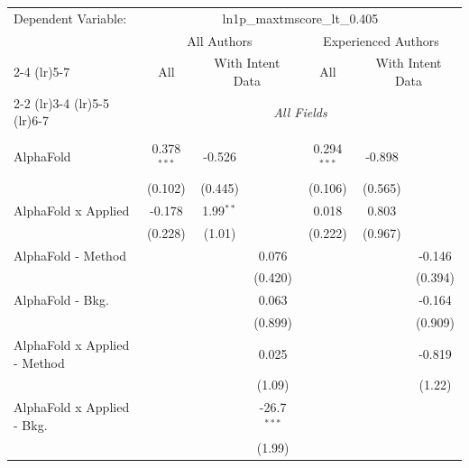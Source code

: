 \begingroup
\centering
\begin{tabular}{lcccccc}
   \tabularnewline \midrule \midrule
   Dependent Variable: & \multicolumn{6}{c}{ln1p\_maxtmscore\_lt\_0.405}\\
 & \multicolumn{3}{c}{All Authors} & \multicolumn{3}{c}{Experienced Authors} \\
\cmidrule(lr){2-4} \cmidrule(lr){5-7}
 & \multicolumn{1}{c}{All} & \multicolumn{2}{c}{With Intent Data} & \multicolumn{1}{c}{All} & \multicolumn{2}{c}{With Intent Data} \\
\cmidrule(lr){2-2} \cmidrule(lr){3-4} \cmidrule(lr){5-5} \cmidrule(lr){6-7}
 & \multicolumn{6}{c}{\textit{All Fields}} \\ \\
   AlphaFold                      & 0.378$^{***}$ & -0.526        &               & 0.294$^{***}$ & -0.898       &   \\   
                                  & (0.102)       & (0.445)       &               & (0.106)       & (0.565)      &   \\   
   AlphaFold x Applied            & -0.178        & 1.99$^{**}$   &               & 0.018         & 0.803        &   \\   
                                  & (0.228)       & (1.01)        &               & (0.222)       & (0.967)      &   \\   
   AlphaFold - Method             &               &               & 0.076         &               &              & -0.146\\   
                                  &               &               & (0.420)       &               &              & (0.394)\\   
   AlphaFold - Bkg.               &               &               & 0.063         &               &              & -0.164\\   
                                  &               &               & (0.899)       &               &              & (0.909)\\   
   AlphaFold x Applied - Method   &               &               & 0.025         &               &              & -0.819\\   
                                  &               &               & (1.09)        &               &              & (1.22)\\   
   AlphaFold x Applied - Bkg.     &               &               & -26.7$^{***}$ &               &              &   \\   
                                  &               &               & (1.99)        &               &              &   \\   

\end{tabular}
